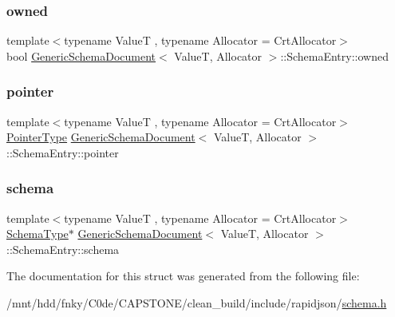 \subsubsection{\texorpdfstring{owned}{owned}}
{\footnotesize\ttfamily template$<$typename ValueT , typename Allocator  = Crt\+Allocator$>$ \\
bool \hyperlink{classGenericSchemaDocument}{Generic\+Schema\+Document}$<$ ValueT, Allocator $>$\+::Schema\+Entry\+::owned}

\mbox{\label{structGenericSchemaDocument_1_1SchemaEntry_a55cb1fc9735973d1b4c4e481541d9e00}} 
\subsubsection{\texorpdfstring{pointer}{pointer}}
{\footnotesize\ttfamily template$<$typename ValueT , typename Allocator  = Crt\+Allocator$>$ \\
\hyperlink{classGenericSchemaDocument_aeb62f562d4dc024402b00f97cbcef747}{Pointer\+Type} \hyperlink{classGenericSchemaDocument}{Generic\+Schema\+Document}$<$ ValueT, Allocator $>$\+::Schema\+Entry\+::pointer}

\mbox{\label{structGenericSchemaDocument_1_1SchemaEntry_ae43ba2bb10eaece15ac9dc6eeaeb5ecf}} 
\subsubsection{\texorpdfstring{schema}{schema}}
{\footnotesize\ttfamily template$<$typename ValueT , typename Allocator  = Crt\+Allocator$>$ \\
\hyperlink{classGenericSchemaDocument_acaf115202b159a2eb72c97c3dc6c3895}{Schema\+Type}$\ast$ \hyperlink{classGenericSchemaDocument}{Generic\+Schema\+Document}$<$ ValueT, Allocator $>$\+::Schema\+Entry\+::schema}



The documentation for this struct was generated from the following file\+:\begin{DoxyCompactItemize}
\item 
/mnt/hdd/fnky/\+C0de/\+C\+A\+P\+S\+T\+O\+N\+E/clean\+\_\+build/include/rapidjson/\hyperlink{schema_8h}{schema.\+h}\end{DoxyCompactItemize}

